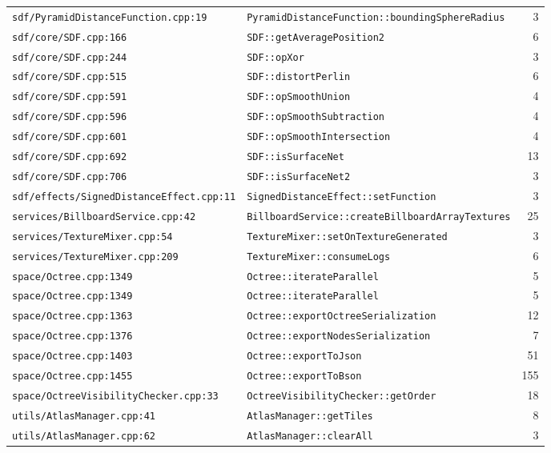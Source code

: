 \documentclass[11pt,a4paper]{article}
\begin{document}
{\begin{longtable}{L{0.40\textwidth} L{0.48\textwidth} r}
\texttt{sdf/PyramidDistanceFunction.cpp:19} & \texttt{PyramidDistanceFunction::boundingSphereRadius} & 3 \\
\texttt{sdf/core/SDF.cpp:166} & \texttt{SDF::getAveragePosition2} & 6 \\
\texttt{sdf/core/SDF.cpp:244} & \texttt{SDF::opXor} & 3 \\
\texttt{sdf/core/SDF.cpp:515} & \texttt{SDF::distortPerlin} & 6 \\
\texttt{sdf/core/SDF.cpp:591} & \texttt{SDF::opSmoothUnion} & 4 \\
\texttt{sdf/core/SDF.cpp:596} & \texttt{SDF::opSmoothSubtraction} & 4 \\
\texttt{sdf/core/SDF.cpp:601} & \texttt{SDF::opSmoothIntersection} & 4 \\
\texttt{sdf/core/SDF.cpp:692} & \texttt{SDF::isSurfaceNet} & 13 \\
\texttt{sdf/core/SDF.cpp:706} & \texttt{SDF::isSurfaceNet2} & 3 \\
\texttt{sdf/effects/SignedDistanceEffect.cpp:11} & \texttt{SignedDistanceEffect::setFunction} & 3 \\
\texttt{services/BillboardService.cpp:42} & \texttt{BillboardService::createBillboardArrayTextures} & 25 \\
\texttt{services/TextureMixer.cpp:54} & \texttt{TextureMixer::setOnTextureGenerated} & 3 \\
\texttt{services/TextureMixer.cpp:209} & \texttt{TextureMixer::consumeLogs} & 6 \\
\texttt{space/Octree.cpp:1349} & \texttt{Octree::iterateParallel} & 5 \\
\texttt{space/Octree.cpp:1349} & \texttt{Octree::iterateParallel} & 5 \\
\texttt{space/Octree.cpp:1363} & \texttt{Octree::exportOctreeSerialization} & 12 \\
\texttt{space/Octree.cpp:1376} & \texttt{Octree::exportNodesSerialization} & 7 \\
\texttt{space/Octree.cpp:1403} & \texttt{Octree::exportToJson} & 51 \\
\texttt{space/Octree.cpp:1455} & \texttt{Octree::exportToBson} & 155 \\
\texttt{space/OctreeVisibilityChecker.cpp:33} & \texttt{OctreeVisibilityChecker::getOrder} & 18 \\
\texttt{utils/AtlasManager.cpp:41} & \texttt{AtlasManager::getTiles} & 8 \\
\texttt{utils/AtlasManager.cpp:62} & \texttt{AtlasManager::clearAll} & 3 \\

\end{longtable}}
\end{document}
